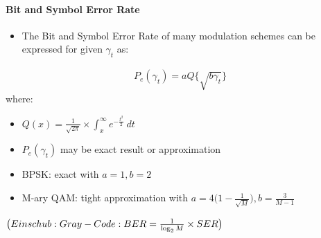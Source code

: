 \documentclass[a4paper, 10pt]{article}
\begin{document}
\paragraph{Bit and Symbol Error Rate}
\begin{itemize}
	\item The Bit and Symbol Error Rate of many modulation schemes can be expressed for given $\gamma_t$ as:
\end{itemize}
\begin{align*}
	P_e(\gamma_t) = aQ\bigl\{ \sqrt{b\gamma_t}\bigr\}
\end{align*}
where:
\begin{itemize}
	\item $Q(x) = \frac{1}{\sqrt{2\pi}}\times\int_{x}^{\infty} e^{-\frac{t^2}{2}}~dt$
	\item $P_e(\gamma_t)$ may be exact result or approximation
	\item BPSK: exact with $a = 1, b = 2$
	\item M-ary QAM: tight approximation with $a = 4\bigl (1-\frac{1}{\sqrt{M}}\bigr ), b =  \frac{3}{M - 1}$
\end{itemize}
\begin{math} \bigl ({\small Einschub: Gray-Code: {BER} = \frac{1}{\log_2M} \times {SER} }\bigr ) \end{math}
\end{document}

